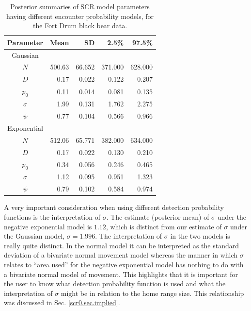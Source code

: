 \begin{table}[ht]
\centering
\caption{Posterior summaries of SCR model parameters having 
  different encounter probability models, for the Fort Drum black bear data.}
\begin{tabular}{crrrr}
\hline \hline
Parameter & Mean & SD & 2.5\% & 97.5\% \\
\hline

Gaussian  &   &      &           &        \\
\hline
$N$    &  500.63 & 66.652  & 371.000   & 628.000       \\
$D$    &   0.17   & 0.022     &  0.122 & 0.207  \\
$p_0$  &    0.11  & 0.014   & 0.081& 0.135     \\
$\sigma$ &  1.99 & 0.131  &1.762 & 2.275     \\
$\psi$  &   0.77  & 0.104    & 0.566 & 0.966    \\

Exponential &   &      &          &        \\
\hline
$N$   &  512.06 &  65.771  &	382.000		& 	634.000	 \\
$D$  &   0.17 &  0.022 &	0.130		& 	0.210	 \\
$p_0$  &    0.34 &   0.056  &	0.246	& 0.465		 \\
$\sigma$ &  1.12  & 0.095  &	0.951		& 	1.323	 \\ 
$\psi$  &   0.79  &  0.102  &	0.584		& 	0.974	 \\ \hline
\end{tabular}
\label{covariates.tab.SCR0exp}
\end{table}

A very important consideration when using different detection
probability functions is the interpretation of $\sigma$.  The estimate
(posterior mean) of $\sigma$ under the negative exponential model is
$1.12$, which is distinct from our estimate of $\sigma$ under the
Gaussian model, $\sigma = 1.996$.  The interpretation of $\sigma$ in
the two models is really quite distinct. In the normal model it can be
interpreted as the standard deviation of a bivariate normal movement
model whereas the manner in which $\sigma$ relates to ``area used''
for the negative exponential model has nothing to do with a bivariate
normal model of movement.  This highlights that it is important for
the user to know what detection probability function is used and what
the interpretation of $\sigma$ might be in relation to the home range
size.  This relationship was discussed in Sec. \ref{scr0.sec.implied}.

